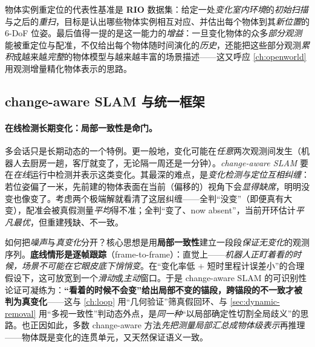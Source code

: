 \noindent 物体实例重定位的代表性基准是 \textbf{RIO} 数据集：给定一处\emph{变化室内环境}的\emph{初始扫描}与之后的\emph{重扫}，目标是认出哪些物体实例相互对应、并估出每个物体到其\emph{新位置}的 6-DoF 位姿\cite{schmid2026dynamic}。最后值得一提的是这一能力的\emph{增益}：一旦变化物体的众多\emph{部分观测}能被重定位与配准，不仅给出每个物体随时间演化的\emph{历史}，还能把这些部分观测\emph{累积}成越来越\emph{完整}的物体模型与越来越丰富的场景描述——这又呼应 \cref{ch:openworld} 用观测增量精化物体表示的思路。

\subsection{change-aware SLAM 与统一框架}
\label{sec:dynamic-change-aware}

\paragraph{在线检测长期变化：局部一致性是命门。}
多会话只是长期动态的一个特例。更一般地，变化可能在\emph{任意}两次观测间发生（机器人去厨房一趟，客厅就变了，无论隔一周还是一分钟）。\emph{change-aware SLAM} 要在\emph{在线}运行中检测并表示这类变化。其最深的难点，是\emph{变化检测与定位互相纠缠}\cite{schmid2026dynamic}：若位姿偏了一米，先前建的物体表面在当前（偏移的）视角下会\emph{显得缺席}，明明没变也像变了。考虑两个极端解就看清了这层纠缠——全判“没变”（即便真有大变），配准会被真假测量\emph{平均}得不准；全判“变了、now absent”，当前开环估计\emph{平凡最优}，但重建残缺、不一致。

\begin{insight}
如何把\emph{噪声}与\emph{真变化}分开？核心思想是用\textbf{局部一致性}建立一段段\emph{保证无变化}的观测序列\cite{schmid2026dynamic}。\textbf{底线情形是逐帧跟踪}（frame-to-frame）：直觉上——\emph{机器人正盯着看的时候，场景不可能在它眼皮底下悄悄变}。在“变化率低 $+$ 短时里程计误差小”的合理假设下，这可放宽到一个\emph{滑动}或\emph{主动}窗口。于是 change-aware SLAM 的可识别性论证可凝练为：\textbf{“看着的时候不会变”给出局部不变的锚段，跨锚段的不一致才被判为真变化}——这与 \cref{ch:loop} 用“几何验证”筛真假回环、与 \cref{sec:dynamic-removal} 用“多视一致性”判动态外点，是\emph{同一种}“以局部确定性切割全局歧义”的思路。也正因如此，多数 change-aware 方法\emph{先把测量局部汇总成物体级表示}再推理——物体既是变化的连贯单元，又天然保证语义一致。
\end{insight}

